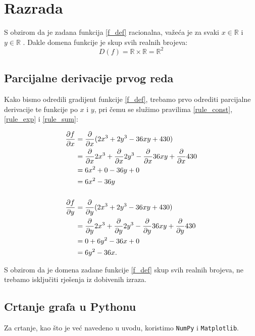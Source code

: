 \chapter{Razrada}

S obzirom da je zadana funkcija \eqref{f_def} racionalna, važeća je za svaki $x \in \mathbb{R}$ i $y \in \mathbb{R}$ \cite[vidi][119]{kolegij}.
Dakle domena funkcije je skup svih realnih brojeva:
$$
    D(f) = \mathbb{R} \times \mathbb{R} = \mathbb{R}^2
$$

\section{Parcijalne derivacije prvog reda}

Kako bismo odredili gradijent funkcije \eqref{f_def}, trebamo prvo odrediti parcijalne derivacije te funkcije po $x$ i $y$, pri čemu se služimo pravilima \eqref{rule_const}, \eqref{rule_exp} i \eqref{rule_sum}:

\begin{align*}
    \frac{\partial f}{\partial x} & = \frac{\partial}{\partial x} (2x^3 + 2y^3 - 36xy + 430) \\
    & = \frac{\partial}{\partial x} 2x^3 + \frac{\partial}{\partial x}2y^3 - \frac{\partial}{\partial x}36xy + \frac{\partial}{\partial x}430 \\
    & = 6x^2 + 0 - 36y + 0 \\
    & = 6x^2 - 36y \\
    \\
    \frac{\partial f}{\partial y} & = \frac{\partial}{\partial y} (2x^3 + 2y^3 - 36xy + 430) \\
    & = \frac{\partial}{\partial y} 2x^3 + \frac{\partial}{\partial y}2y^3 - \frac{\partial}{\partial y}36xy + \frac{\partial}{\partial y}430 \\
    & = 0 + 6y^2 - 36x + 0\\
    & = 6y^2 - 36x \textnormal{.}
\end{align*}

S obzirom da je domena zadane funkcije \eqref{f_def} skup svih realnih brojeva, ne trebamo isključiti rješenja iz dobivenih izraza.

\newpage
\section{Crtanje grafa u Pythonu}

Za crtanje, kao što je već navedeno u uvodu, koristimo \verb|NumPy| i \verb|Matplotlib|.


